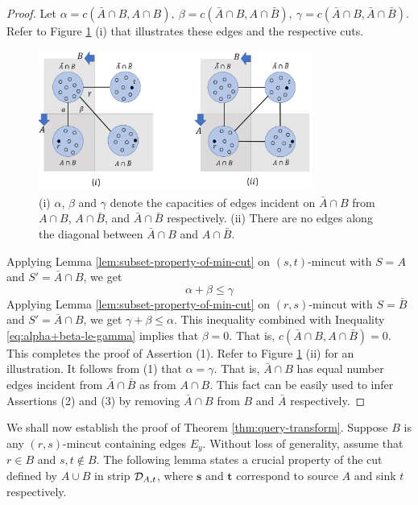 \begin{proof}
Let $\alpha = c(\bar{A}\cap B, A\cap {B}),
~\beta = c(\bar{A} \cap B, A\cap \bar{B}),~\gamma=c(\bar{A} \cap B, \bar{A}\cap \bar{B})$.
Refer to Figure \ref{fig:non-S-crossing} (i) that illustrates these edges and the respective cuts.
\begin{figure}[H]
\centering
\includegraphics[width=0.8\textwidth]{src/images/S-crossing-and-non-crossing_new.pdf}
    \caption{(i) $\alpha$, $\beta$ and $\gamma$ denote the capacities of edges incident on $\bar{A}\cap B$ from $A\cap B$, $A\cap \bar{B}$, and $\bar{A} \cap \bar{B}$ respectively. (ii) There are no edges along the diagonal between $\bar{A}\cap {B}$ and $A\cap \bar{B}$.}
\label{fig:non-S-crossing}
\end{figure}

Applying Lemma \ref{lem:subset-property-of-min-cut}
on $(s,t)$-mincut with $S=A$ and $S'= \bar{A}\cap B$, we get
\begin{equation}
    \alpha + \beta \le \gamma 
\label{eq:alpha+beta-le-gamma}
\end{equation}
Applying Lemma \ref{lem:subset-property-of-min-cut} on $(r,s)$-mincut with $S=\bar B$ and  $S'= \bar{A} \cap B$, we get $\gamma + \beta \le \alpha$. This inequality combined with Inequality \ref{eq:alpha+beta-le-gamma} implies that $\beta=0$. That is, $c(\bar{A}\cap B, A\cap \bar{B})=0$. This completes the proof of Assertion (1). Refer to Figure \ref{fig:non-S-crossing} (ii) for an illustration. 
It follows from (1) that $\alpha=\gamma$.
That is, $\bar{A} \cap B$ has equal number edges incident from $\bar{A}\cap \bar{B}$ as from $A\cap B$.  This fact can be easily used to infer Assertions (2) and (3) by 
removing $\bar{A}\cap B$ from $B$ and
$\bar{A}$ respectively.
\end{proof}

We shall now establish the proof of Theorem \ref{thm:query-transform}. Suppose $B$ is any $(r,s)$-mincut containing edges $E_y$. Without loss of generality, assume that $r\in B$ and $s,t\notin B$. The following lemma states a crucial property of the cut defined by $A\cup B$ in strip ${\cal D}_{A,t}$, where $\mathbf{s}$ and $\mathbf{t}$ correspond to source $A$ and sink $t$ respectively.


